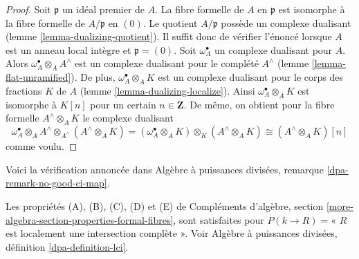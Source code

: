 \begin{proof}
Soit $\mathfrak p$ un idéal premier de $A$.
La fibre formelle de $A$ en $\mathfrak p$ est isomorphe à la fibre formelle
de $A/\mathfrak p$ en $(0)$. Le quotient $A/\mathfrak p$ possède un complexe dualisant
(lemme \ref{lemma-dualizing-quotient}). Il suffit donc de vérifier l'énoncé lorsque $A$
est un anneau local intègre et $\mathfrak p = (0)$.
Soit $\omega_A^\bullet$ un complexe dualisant pour $A$.
Alors $\omega_A^\bullet \otimes_A A^\wedge$ est un complexe dualisant pour le complété $A^\wedge$
(lemme \ref{lemma-flat-unramified}).
De plus, $\omega_A^\bullet \otimes_A K$ est un complexe dualisant pour le corps des fractions $K$
de $A$ (lemme \ref{lemma-dualizing-localize}).
Ainsi $\omega_A^\bullet \otimes_A K$ est isomorphe à $K[n]$ pour un certain $n \in \mathbf{Z}$.
De même, on obtient pour la fibre formelle $A^\wedge \otimes_A K$ le complexe dualisant
$$
\omega_A^\bullet \otimes_A A^\wedge \otimes_{A^\wedge} (A^\wedge \otimes_A K) =
(\omega_A^\bullet \otimes_A K) \otimes_K (A^\wedge \otimes_A K) \cong
(A^\wedge \otimes_A K)[n]
$$
comme voulu.
\end{proof}

\noindent
Voici la vérification annoncée dans Algèbre à puissances divisées,
remarque \ref{dpa-remark-no-good-ci-map}.

\begin{lemma}
\label{lemma-formal-fibres-lci}
Les propriétés (A), (B), (C), (D) et (E) de
Compléments d'algèbre, section \ref{more-algebra-section-properties-formal-fibres},
sont satisfaites pour $P(k \to R) =$« $R$ est localement une intersection complète ».
Voir Algèbre à puissances divisées, définition \ref{dpa-definition-lci}.
\end{lemma}

